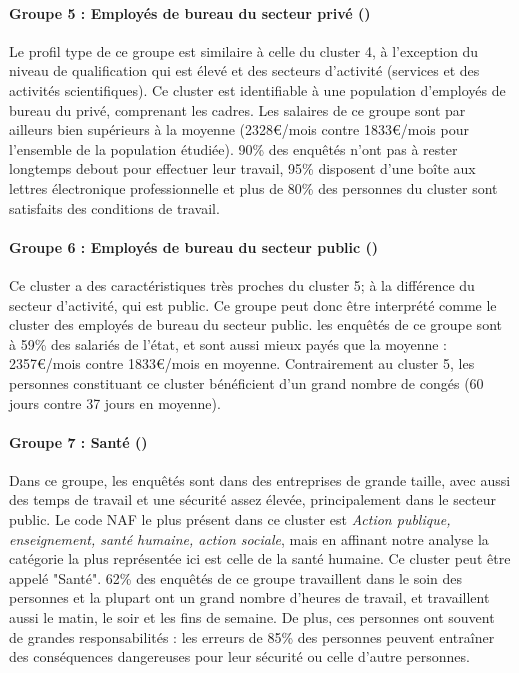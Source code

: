 \documentclass[11pt,fleqn,openany,frenchb]{book} %
\begin{document}
\paragraph{Groupe 5 : Employés de bureau du secteur privé (\CSPPPr)\\}
Le profil type de ce groupe est similaire à celle du cluster 4, à l'exception du niveau de qualification qui est élevé et des secteurs d'activité (services et des activités scientifiques). Ce cluster est identifiable à une population d'employés de bureau du privé, comprenant les cadres. Les salaires de ce groupe sont par ailleurs bien supérieurs à la moyenne (2328\euro{}/mois contre 1833\euro{}/mois pour l'ensemble de la population étudiée). 90\% des enquêtés n'ont pas à rester longtemps debout pour effectuer leur travail, 95\% disposent d'une boîte aux lettres électronique professionnelle et plus de 80\% des personnes du cluster sont satisfaits des conditions de travail.

\paragraph{Groupe 6 : Employés de bureau du secteur public (\CSPPPu)\\}
Ce cluster a des caractéristiques très proches du cluster 5; à la différence du secteur d'activité, qui est public. Ce groupe peut donc être interprété comme le cluster des employés de bureau du secteur public. les enquêtés de ce groupe sont à 59\% des salariés de l'état, et sont aussi mieux payés que la moyenne : 2357\euro{}/mois contre 1833\euro{}/mois en moyenne. Contrairement au cluster 5, les personnes constituant ce cluster bénéficient d'un grand nombre de congés (60 jours contre 37 jours en moyenne).

\paragraph{Groupe 7 : Santé (\SANTE) \\}
Dans ce groupe, les enquêtés sont dans des entreprises de grande taille, avec aussi des temps de travail et une sécurité assez élevée, principalement dans le secteur public. Le code NAF le plus présent dans ce cluster est \textit{Action publique, enseignement, santé humaine, action sociale}, mais en affinant notre analyse la catégorie la plus représentée ici est celle de la santé humaine. Ce cluster peut être appelé "Santé". 62\% des enquêtés de ce groupe travaillent dans le soin des personnes et la plupart ont un grand nombre d'heures de travail, et travaillent aussi le matin, le soir et les fins de semaine. De plus, ces personnes ont souvent de grandes responsabilités : les erreurs de 85\% des personnes peuvent entraîner des conséquences dangereuses pour leur sécurité ou celle d'autre personnes.
\end{document}
